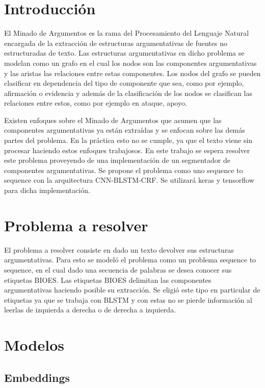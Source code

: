 \documentclass[runningheads]{llncs}
\begin{document}
\section{Introducción}

El Minado de Argumentos es la rama del Procesamiento del Lenguaje Natural encargada
de la extracción de estructuras argumentativas de fuentes no estructuradas de texto.
Las estructuras argumentativas en dicho problema se modelan como un grafo en el cual
los nodos son las componentes argumentativas y las aristas las relaciones entre estas
componentes. Los nodos del grafo se pueden clasificar en dependencia del tipo de componente
que sea, como por ejemplo, afirmación o evidencia y además de la clasificación de los
nodos se clasifican las relaciones entre estos, como por ejemplo en ataque, apoyo.

Existen enfoques sobre el Minado de Argumentos que asumen que las componentes argumentativas ya
están extraídas y se enfocan sobre las demás partes del problema. En la práctica esto no se
cumple, ya que el texto viene sin procesar haciendo estos enfoques trabajosos. En este
trabajo se espera resolver este problema proveyendo de una implementación de un segmentador
de componentes argumentativas. Se propone el problema como uno sequence to sequence con 
la arquitectura CNN-BLSTM-CRF. Se utilizará keras y tensorflow para dicha implementación.

\section{Problema a resolver}

El problema a resolver consiste en dado un texto devolver sus estructuras argumentativas.
Para esto se modeló el problema como un problema sequence to sequence, en el cual dado una
secuencia de palabras se desea conocer sus etiquetas BIOES. Las etiquetas BIOES delimitan
las componentes argumentativas haciendo posible su extracción. Se eligió este tipo en particular
de etiquetas ya que se trabaja con BLSTM y con estas no se pierde información al leerlas de 
izquierda a derecha o de derecha a izquierda.

\section{Modelos}

\subsection{Embeddings}
\end{document}
